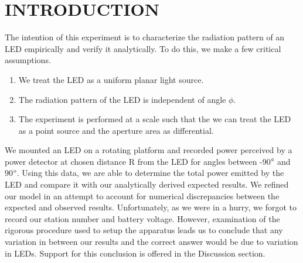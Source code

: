 \section{INTRODUCTION}
The intention of this experiment is to characterize the radiation pattern of an LED empirically and verify it analytically. To do this, we make a few critical assumptions.
\begin{enumerate}
\item We treat the LED as a uniform planar light source.
\item The radiation pattern of the LED is independent of angle $\phi$.
\item The experiment is performed at a scale such that the we can treat the LED as a point source and the aperture area as differential.
\end{enumerate}

We mounted an LED on a rotating platform and recorded power perceived by a power detector at chosen distance R from the LED for angles between -90$\degree$ and 90$\degree$. Using this data, we are able to determine the total power emitted by the LED and compare it with our analytically derived expected results. We refined our model in an attempt to account for numerical discrepancies between the expected and observed results. Unfortunately, as we were in a hurry, we forgot to record our station number and battery voltage. However, examination of the rigorous procedure used to setup the apparatus leads us to conclude that any variation in between our results and the correct answer would be due to variation in LEDs. Support for this conclusion is offered in the Discussion section.